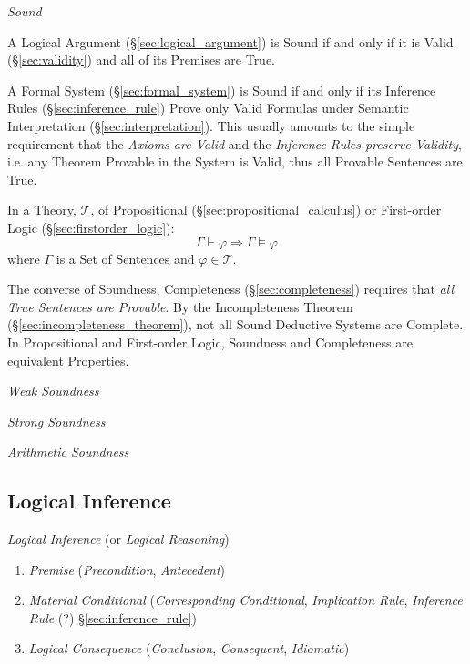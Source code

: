 \emph{Sound}

A Logical Argument (\S\ref{sec:logical_argument}) is Sound if and only
if it is Valid (\S\ref{sec:validity}) and all of its Premises are
True.

A Formal System (\S\ref{sec:formal_system}) is Sound if and only if its
Inference Rules (\S\ref{sec:inference_rule}) Prove only Valid Formulas under
Semantic Interpretation (\S\ref{sec:interpretation}). This usually amounts to
the simple requirement that the \emph{Axioms are Valid} and the \emph{Inference
  Rules preserve Validity}, i.e. any Theorem Provable in the System is Valid,
thus all Provable Sentences are True.

In a Theory, $\mathcal{T}$, of Propositional
(\S\ref{sec:propositional_calculus}) or First-order Logic
(\S\ref{sec:firstorder_logic}):
\[
  \Gamma \vdash \varphi \Rightarrow \Gamma \vDash \varphi
\]
where $\Gamma$ is a Set of Sentences and $\varphi \in \mathcal{T}$.

The converse of Soundness, Completeness (\S\ref{sec:completeness}) requires
that \emph{all True Sentences are Provable}. By the Incompleteness Theorem
(\S\ref{sec:incompleteness_theorem}), not all Sound Deductive Systems are
Complete. In Propositional and First-order Logic, Soundness and Completeness
are equivalent Properties.

\emph{Weak Soundness}

\emph{Strong Soundness}

\emph{Arithmetic Soundness}



\subsection{Logical Inference}\label{sec:logical_inference}

\emph{Logical Inference} (or \emph{Logical Reasoning})

\begin{enumerate}
\item \emph{Premise} (\emph{Precondition}, \emph{Antecedent})

\item \emph{Material Conditional} (\emph{Corresponding Conditional},
  \emph{Implication Rule}, \emph{Inference Rule} (?) \S\ref{sec:inference_rule})

\item \emph{Logical Consequence} (\emph{Conclusion}, \emph{Consequent},
  \emph{Idiomatic})
\end{enumerate}

